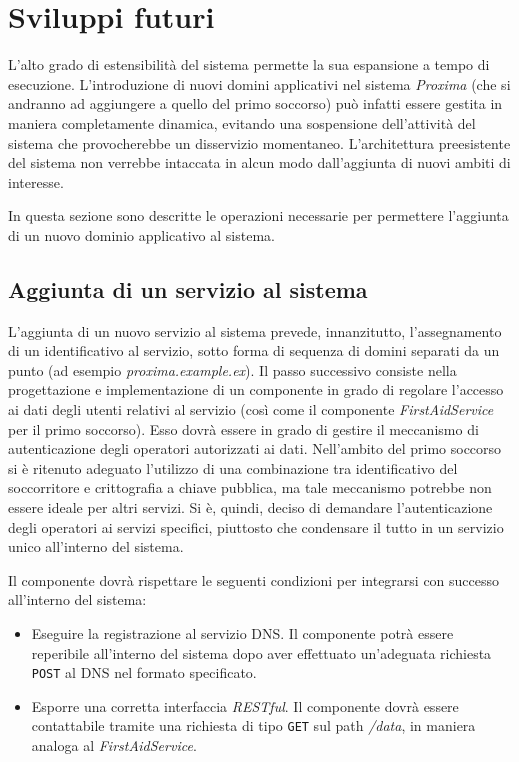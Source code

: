 \documentclass[a4paper,12pt]{report}
\begin{document}
\section{Sviluppi futuri} \label{future-work}
L'alto grado di estensibilità del sistema permette la sua espansione a tempo di esecuzione. L'introduzione di nuovi domini applicativi nel sistema \emph{Proxima} (che si andranno ad aggiungere a quello del primo soccorso) può infatti essere gestita in maniera completamente dinamica, evitando una sospensione dell'attività del sistema che provocherebbe un disservizio momentaneo. L'architettura preesistente del sistema non verrebbe intaccata in alcun modo dall'aggiunta di nuovi ambiti di interesse. 

In questa sezione sono descritte le operazioni necessarie per permettere l'aggiunta di un nuovo dominio applicativo al sistema.

\subsection{Aggiunta di un servizio al sistema}
L'aggiunta di un nuovo servizio al sistema prevede, innanzitutto, l'assegnamento di un identificativo al servizio, sotto forma di sequenza di domini separati da un punto (ad esempio \emph{proxima.example.ex}). Il passo successivo consiste nella progettazione e implementazione di un componente in grado di regolare l'accesso ai dati degli utenti relativi al servizio (così come il componente \emph{FirstAidService} per il primo soccorso). Esso dovrà essere in grado di gestire il meccanismo di autenticazione degli operatori autorizzati ai dati. Nell'ambito del primo soccorso si è ritenuto adeguato l'utilizzo di una combinazione tra identificativo del soccorritore e crittografia a chiave pubblica, ma tale meccanismo potrebbe non essere ideale per altri servizi. Si è, quindi, deciso di demandare l'autenticazione degli operatori ai servizi specifici, piuttosto che condensare il tutto in un servizio unico all'interno del sistema. 

Il componente dovrà rispettare le seguenti condizioni per integrarsi con successo all'interno del sistema:
\begin{itemize}
	\item Eseguire la registrazione al servizio DNS. Il componente potrà essere reperibile all'interno del sistema dopo aver effettuato un'adeguata richiesta \texttt{POST} al DNS nel formato specificato.
	\item Esporre una corretta interfaccia \emph{RESTful}. Il componente dovrà essere contattabile tramite una richiesta di tipo \texttt{GET} sul path \emph{/data}, in maniera analoga al \emph{FirstAidService}.
\end{itemize}
\end{document}
